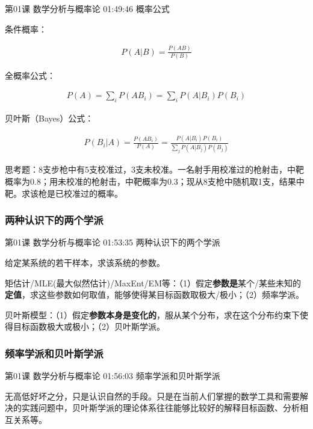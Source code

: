 \documentclass[UTF8]{ctexbook}
\begin{document}
第01课 数学分析与概率论 01:49:46 概率公式

条件概率：

\begin{equation}
\begin{aligned}
P(A|B)=\frac{P(AB)}{P(B)}
\end{aligned}
\end{equation}

全概率公式：

\begin{equation}
\begin{aligned}
P(A)=\sum_{i}P(AB_{i})=\sum_{i}P(A|B_{i})P(B_{i})
\end{aligned}
\end{equation}

贝叶斯（Bayes）公式：

\begin{equation}
\begin{aligned}
P(B_{i}|A)=\frac{P(AB_{i})}{P(A)}=\frac{P(A|B_{i})P(B_{i})}{\sum_{j}P(A|B_{j})P(B_{j})}
\end{aligned}
\end{equation}

思考题：8支步枪中有5支校准过，3支未校准。一名射手用校准过的枪射击，中靶概率为0.8；用未校准的枪射击，中靶概率为0.3；现从8支枪中随机取1支，结果中靶。求该枪是已校准过的概率。

\subsubsection{两种认识下的两个学派}

第01课 数学分析与概率论 01:53:35 两种认识下的两个学派

给定某系统的若干样本，求该系统的参数。

矩估计/MLE(最大似然估计)/MaxEnt/EM等：（1）假定\textbf{参数是}某个/某些未知的\textbf{定值}，求这些参数如何取值，能够使得某目标函数取极大/极小；（2）频率学派。

贝叶斯模型：（1）假定\textbf{参数本身是变化的}，服从某个分布，求在这个分布约束下使得目标函数极大或极小；（2）贝叶斯学派。

\subsubsection{频率学派和贝叶斯学派}

第01课 数学分析与概率论 01:56:03 频率学派和贝叶斯学派

无高低好坏之分，只是认识自然的手段。只是在当前人们掌握的数学工具和需要解决的实践问题中，贝叶斯学派的理论体系往往能够比较好的解释目标函数、分析相互关系等。
\end{document}

